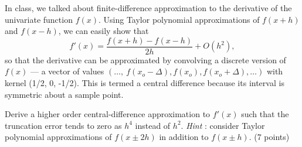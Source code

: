 \begin{problem}
  In class, we talked about finite-difference approximation
  to the derivative of the univariate function $f(x)$.
  Using Taylor polynomial approximations of $f(x + h)$ and $f(x - h)$,
  we can easily show that \[ f'(x) = \frac{f(x + h) - f(x - h)}{2h} + O(h^2), \]
  so that the derivative can be approximated by convolving
  a discrete version of $f(x)$ --- a vector of values
  $(\ldots,\ f(x_{o} - \Delta), f(x_{o}), f(x_{o}+ \Delta), \ldots)$
  with kernel (1/2, 0, -1/2).
  This is termed a central difference because its interval is symmetric about a sample point.

  \begin{enumroman}
    \item Derive a higher order central-difference approximation
      to $f'(x)$ such that the truncation error tends to zero
      as $h^4$ instead of $h^2$.
      \emph{Hint} : consider Taylor polynomial approximations of $f(x \pm 2h)$
        in addition to $f(x \pm h)$. (7 points)


\end{enumroman}
\end{problem}
